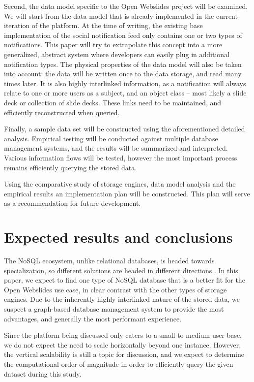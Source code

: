 \documentclass[fleqn,10pt]{voorstel}
\begin{document}
Second, the data model specific to the Open Webslides project will be examined. We will start from the data model that is already implemented in the current iteration of the platform. At the time of writing, the existing base implementation of the social notification feed only contains one or two types of notifications. This paper will try to extrapolate this concept into a more generalized, abstract system where developers can easily plug in additional notification types.
The physical properties of the data model will also be taken into account: the data will be written once to the data storage, and read many times later. It is also highly interlinked information, as a notification will always relate to one or more users as a subject, and an object class -- most likely a slide deck or collection of slide decks. These links need to be maintained, and efficiently reconstructed when queried.

Finally, a sample data set will be constructed using the aforementioned detailed analysis. Empirical testing will be conducted against multiple database management systems, and the results will be summarized and interpreted. Various information flows will be tested, however the most important process remains efficiently querying the stored data.

Using the comparative study of storage engines, data model analysis and the empirical results an implementation plan will be constructed. This plan will serve as a recommendation for future development.

\section{Expected results and conclusions}
\label{sec:expected_results_and_conclusions}

The NoSQL ecosystem, unlike relational databases, is headed towards specialization, so different solutions are headed in different directions \autocite{Maroo2013}. In this paper, we expect to find one type of NoSQL database that is a better fit for the Open Webslides use case, in clear contrast with the other types of storage engines. Due to the inherently highly interlinked nature of the stored data, we suspect a graph-based database management system to provide the most advantages, and generally the most performant experience.

Since the platform being discussed only caters to a small to medium user base, we do not expect the need to scale horizontally beyond one instance. However, the vertical scalability is still a topic for discussion, and we expect to determine the computational order of magnitude in order to efficiently query the given dataset during this study.
\end{document}
